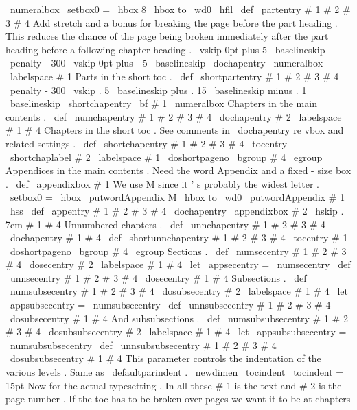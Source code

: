{{{\
numeralbox
{
\
setbox0
=
\
hbox
{
8
}
\
hbox
to
\
wd0
{
\
hfil
}
}
\
def
\
partentry
#
1
#
2
#
3
#
4
{
%
%
Add
stretch
and
a
bonus
for
breaking
the
page
before
the
part
heading
.
%
This
reduces
the
chance
of
the
page
being
broken
immediately
after
the
%
part
heading
before
a
following
chapter
heading
.
\
vskip
0pt
plus
5
\
baselineskip
\
penalty
-
300
\
vskip
0pt
plus
-
5
\
baselineskip
\
dochapentry
{
\
numeralbox
\
labelspace
#
1
}
{
}
%
}
%
%
Parts
in
the
short
toc
.
\
def
\
shortpartentry
#
1
#
2
#
3
#
4
{
%
\
penalty
-
300
\
vskip
.
5
\
baselineskip
plus
.
15
\
baselineskip
minus
.
1
\
baselineskip
\
shortchapentry
{
{
\
bf
#
1
}
}
{
\
numeralbox
}
{
}
{
}
%
}
%
Chapters
in
the
main
contents
.
\
def
\
numchapentry
#
1
#
2
#
3
#
4
{
\
dochapentry
{
#
2
\
labelspace
#
1
}
{
#
4
}
}
%
Chapters
in
the
short
toc
.
%
See
comments
in
\
dochapentry
re
vbox
and
related
settings
.
\
def
\
shortchapentry
#
1
#
2
#
3
#
4
{
%
\
tocentry
{
\
shortchaplabel
{
#
2
}
\
labelspace
#
1
}
{
\
doshortpageno
\
bgroup
#
4
\
egroup
}
%
}
%
Appendices
in
the
main
contents
.
%
Need
the
word
Appendix
and
a
fixed
-
size
box
.
%
\
def
\
appendixbox
#
1
{
%
%
We
use
M
since
it
'
s
probably
the
widest
letter
.
\
setbox0
=
\
hbox
{
\
putwordAppendix
{
}
M
}
%
\
hbox
to
\
wd0
{
\
putwordAppendix
{
}
#
1
\
hss
}
}
%
\
def
\
appentry
#
1
#
2
#
3
#
4
{
\
dochapentry
{
\
appendixbox
{
#
2
}
\
hskip
.
7em
#
1
}
{
#
4
}
}
%
Unnumbered
chapters
.
\
def
\
unnchapentry
#
1
#
2
#
3
#
4
{
\
dochapentry
{
#
1
}
{
#
4
}
}
\
def
\
shortunnchapentry
#
1
#
2
#
3
#
4
{
\
tocentry
{
#
1
}
{
\
doshortpageno
\
bgroup
#
4
\
egroup
}
}
%
Sections
.
\
def
\
numsecentry
#
1
#
2
#
3
#
4
{
\
dosecentry
{
#
2
\
labelspace
#
1
}
{
#
4
}
}
\
let
\
appsecentry
=
\
numsecentry
\
def
\
unnsecentry
#
1
#
2
#
3
#
4
{
\
dosecentry
{
#
1
}
{
#
4
}
}
%
Subsections
.
\
def
\
numsubsecentry
#
1
#
2
#
3
#
4
{
\
dosubsecentry
{
#
2
\
labelspace
#
1
}
{
#
4
}
}
\
let
\
appsubsecentry
=
\
numsubsecentry
\
def
\
unnsubsecentry
#
1
#
2
#
3
#
4
{
\
dosubsecentry
{
#
1
}
{
#
4
}
}
%
And
subsubsections
.
\
def
\
numsubsubsecentry
#
1
#
2
#
3
#
4
{
\
dosubsubsecentry
{
#
2
\
labelspace
#
1
}
{
#
4
}
}
\
let
\
appsubsubsecentry
=
\
numsubsubsecentry
\
def
\
unnsubsubsecentry
#
1
#
2
#
3
#
4
{
\
dosubsubsecentry
{
#
1
}
{
#
4
}
}
%
This
parameter
controls
the
indentation
of
the
various
levels
.
%
Same
as
\
defaultparindent
.
\
newdimen
\
tocindent
\
tocindent
=
15pt
%
Now
for
the
actual
typesetting
.
In
all
these
#
1
is
the
text
and
#
2
is
the
%
page
number
.
%
%
If
the
toc
has
to
be
broken
over
pages
we
want
it
to
be
at
chapters
}}}
